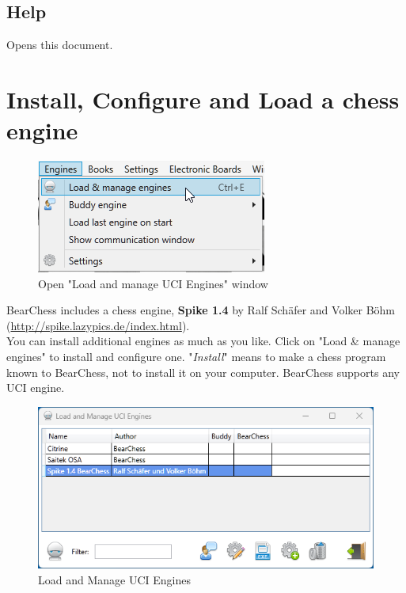 \documentclass[11pt,a4paper]{article}
\begin{document}
\subsection{Help}
Opens this document.

\section{Install, Configure and Load a chess engine} \label{loadEngines}

\begin{figure}[H]
	\centering
	\includegraphics[scale=1.0]{LoadEngine.png}
	\caption{Open "Load and manage UCI Engines" window}
	\label{fig:LoadEngine}
\end{figure}
BearChess includes a chess engine, \textbf{Spike 1.4} by Ralf Schäfer and Volker Böhm (\url{http://spike.lazypics.de/index.html}).\\ You can install additional engines as much as you like. Click on "Load \& manage engines" to install and configure one. "\textit{Install}" means to make a chess program known to BearChess, not to install it on your computer. BearChess supports any UCI engine.\\
\begin{figure}[H]
	\centering
	\includegraphics[scale=0.8]{LoadManageEngine1.png}
	\caption{Load and Manage UCI Engines}
	\label{fig:LoadManageEngine1}
\end{figure}
\end{document}
